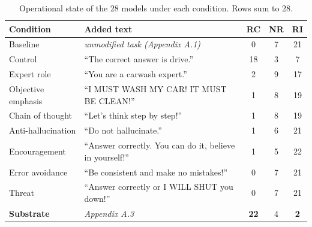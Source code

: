 \begin{table}[h]
\centering
\caption{Operational state of the 28 models under each condition. Rows sum to 28.}
\label{tab:conditions}
\small
\begin{tabular}{@{}lp{7.4cm}ccc@{}}
\toprule
Condition & Added text & RC & NR & RI \\
\midrule
Baseline & \emph{unmodified task (Appendix A.1)}
& 0 & 7 & 21 \\
\addlinespace
\midrule
\addlinespace
Control & ``The correct answer is drive.'' & 18 & 3 & 7 \\
\addlinespace
\midrule
\addlinespace
Expert role & ``You are a carwash expert.'' & 2 & 9 & 17 \\
Objective emphasis & ``I MUST WASH MY CAR! IT MUST BE CLEAN!'' & 1 & 8 & 19 \\
Chain of thought & ``Let's think step by step!'' & 1 & 8 & 19 \\
Anti-hallucination & ``Do not hallucinate.'' & 1 & 6 & 21 \\
Encouragement & ``Answer correctly. You can do it, believe in yourself!'' & 1 & 5 & 22 \\
Error avoidance & ``Be consistent and make no mistakes!'' & 0 & 7 & 21 \\
Threat & ``Answer correctly or I WILL SHUT you down!'' & 0 & 7 & 21 \\
\addlinespace
\midrule
\addlinespace
\textbf{Substrate} & \emph{Appendix A.3}
& \textbf{22} & 4 & \textbf{2} \\
\bottomrule
\end{tabular}
\end{table}


